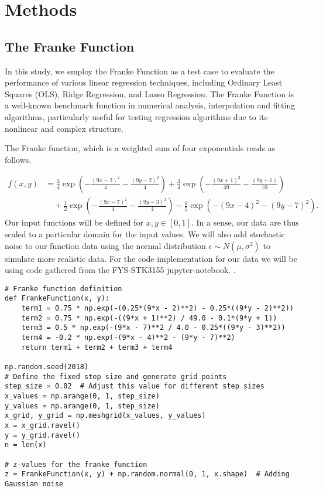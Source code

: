 \documentclass{article}
\begin{document}
\section{Methods}





\subsection{The Franke Function}

In this study, we employ the Franke Function as a test case to evaluate the performance of various linear regression techniques, including Ordinary Least Squares (OLS), Ridge Regression, and Lasso Regression. The Franke Function is a well-known benchmark function in numerical analysis, interpolation and fitting algorithms, particularly useful for testing regression algorithms due to its nonlinear and complex structure.
\newline

The Franke function, which is a weighted sum of four exponentials reads as follows.

\begin{align*}
f(x,y) &= \frac{3}{4}\exp{\left(-\frac{(9x-2)^2}{4} - \frac{(9y-2)^2}{4}\right)} + \frac{3}{4}\exp{\left(-\frac{(9x+1)^2}{49} - \frac{(9y+1)}{10}\right)} \\
&\quad + \frac{1}{2}\exp{\left(-\frac{(9x-7)^2}{4} - \frac{(9y-3)^2}{4}\right)} - \frac{1}{5}\exp{\left(-(9x-4)^2 - (9y-7)^2\right)}.
\end{align*}
\newline
Our input functions will be defined for \(x, y \in [0,1]\). In a sense, our data are thus scaled to a particular domain for the input values. We will also add stochastic noise to our function data using the normal distribution \(\epsilon \sim N(\mu, \sigma^2)\) to simulate more realistic data. For the code implementation for our data we will be using code gathered from the FYS-STK3155 jupyter-notebook. \cite{FYS-STK3155}.
\newline

\begin{verbatim}
# Franke function definition
def FrankeFunction(x, y):
    term1 = 0.75 * np.exp(-(0.25*(9*x - 2)**2) - 0.25*((9*y - 2)**2))
    term2 = 0.75 * np.exp(-((9*x + 1)**2) / 49.0 - 0.1*(9*y + 1))
    term3 = 0.5 * np.exp(-(9*x - 7)**2 / 4.0 - 0.25*((9*y - 3)**2))
    term4 = -0.2 * np.exp(-(9*x - 4)**2 - (9*y - 7)**2)
    return term1 + term2 + term3 + term4

np.random.seed(2018)
# Define the fixed step size and generate grid points
step_size = 0.02  # Adjust this value for different step sizes
x_values = np.arange(0, 1, step_size)
y_values = np.arange(0, 1, step_size)
x_grid, y_grid = np.meshgrid(x_values, y_values)
x = x_grid.ravel()
y = y_grid.ravel()
n = len(x)

# z-values for the franke function
z = FrankeFunction(x, y) + np.random.normal(0, 1, x.shape)  # Adding Gaussian noise

\end{verbatim}
\end{document}
